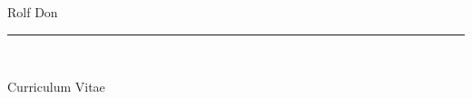 \pagestyle{empty}

\titfont



\begin{flushright}

\fontsize{50pt}{5pt}\selectfont

Rolf Don

\noindent \rule{\textwidth}{1pt} \\ [.28cm]

\fontsize{20pt}{16pt}\titfont\selectfont

Curriculum Vitae

\end{flushright}

\vspace{.5cm}
